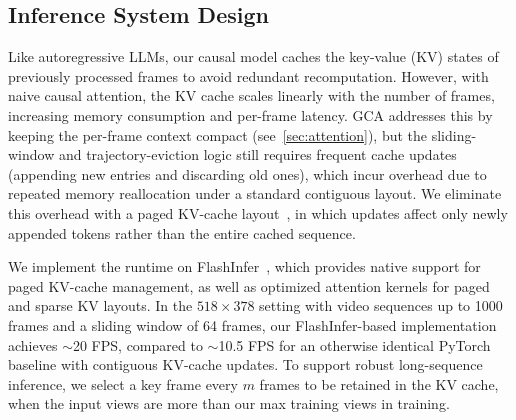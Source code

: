 \subsection{Inference System Design}
\label{sec:inference}

Like autoregressive LLMs, our causal model caches the key-value (KV) states of previously processed frames to avoid redundant recomputation. However, with naive causal attention, the KV cache scales linearly with the number of frames, increasing memory consumption and per-frame latency.
GCA addresses this by keeping the per-frame context compact (see~\cref{sec:attention}), but the sliding-window and trajectory-eviction logic still requires frequent cache updates (appending new entries and discarding old ones), which incur overhead due to repeated memory reallocation under a standard contiguous layout.
We eliminate this overhead with a paged KV-cache layout~\cite{kwon2023efficient}, in which updates affect only newly appended tokens rather than the entire cached sequence.

We implement the runtime on FlashInfer~\cite{ye2025flashinfer}, which provides native support for paged KV-cache management, as well as optimized attention kernels for paged and sparse KV layouts.
In the $518 \times 378$ setting with video sequences up to 1000 frames and a sliding window of 64 frames, our FlashInfer-based implementation achieves $\sim$20 FPS, compared to $\sim$10.5 FPS for an otherwise identical PyTorch baseline with contiguous KV-cache updates.
To support robust long-sequence inference, we select a key frame every $m$ frames to be retained in the KV cache, when the input views are more than our max training views in training.


